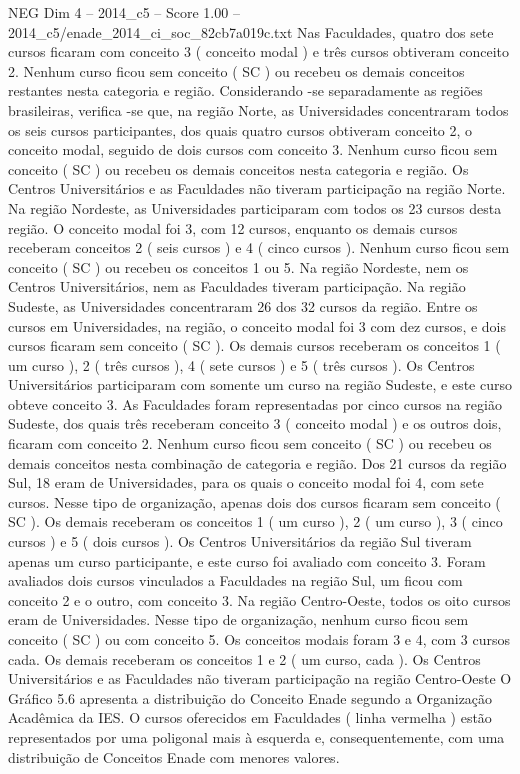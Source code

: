 \begin{textsample}{NEG Dim 4 – 2014\_c5 – Score 1.00 – 2014\_c5/enade\_2014\_ci\_soc\_82cb7a019c.txt}
Nas Faculdades, quatro dos sete cursos ficaram com conceito 3 ( conceito modal ) e três cursos obtiveram conceito 2.
Nenhum curso ficou sem conceito ( SC ) ou recebeu os demais conceitos restantes nesta categoria e região.
Considerando -se separadamente as regiões brasileiras, verifica -se que, na região Norte, as Universidades concentraram todos os seis cursos participantes, dos quais quatro cursos obtiveram conceito 2, o conceito modal, seguido de dois cursos com conceito 3.
Nenhum curso ficou sem conceito ( SC ) ou recebeu os demais conceitos nesta categoria e região.
Os Centros Universitários e as Faculdades não tiveram participação na região Norte.
Na região Nordeste, as Universidades participaram com todos os 23 cursos desta região.
O conceito modal foi 3, com 12 cursos, enquanto os demais cursos receberam conceitos 2 ( seis cursos ) e 4 ( cinco cursos ).
Nenhum curso ficou sem conceito ( SC ) ou recebeu os conceitos 1 ou 5.
Na região Nordeste, nem os Centros Universitários, nem as Faculdades tiveram participação.
Na região Sudeste, as Universidades concentraram 26 dos 32 cursos da região.
Entre os cursos em Universidades, na região, o conceito modal foi 3 com dez cursos, e dois cursos ficaram sem conceito ( SC ).
Os demais cursos receberam os conceitos 1 ( um curso ), 2 ( três cursos ), 4 ( sete cursos ) e 5 ( três cursos ).
Os Centros Universitários participaram com somente um curso na região Sudeste, e este curso obteve conceito 3.
As Faculdades foram representadas por cinco cursos na região Sudeste, dos quais três receberam conceito 3 ( conceito modal ) e os outros dois, ficaram com conceito 2.
Nenhum curso ficou sem conceito ( SC ) ou recebeu os demais conceitos nesta combinação de categoria e região.
Dos 21 cursos da região Sul, 18 eram de Universidades, para os quais o conceito modal foi 4, com sete cursos.
Nesse tipo de organização, apenas dois dos cursos ficaram sem conceito ( SC ).
Os demais receberam os conceitos 1 ( um curso ), 2 ( um curso ), 3 ( cinco cursos ) e 5 ( dois cursos ).
Os Centros Universitários da região Sul tiveram apenas um curso participante, e este curso foi avaliado com conceito 3.
Foram avaliados dois cursos vinculados a Faculdades na região Sul, um ficou com conceito 2 e o outro, com conceito 3.
Na região Centro-Oeste, todos os oito cursos eram de Universidades.
Nesse tipo de organização, nenhum curso ficou sem conceito ( SC ) ou com conceito 5.
Os conceitos modais foram 3 e 4, com 3 cursos cada.
Os demais receberam os conceitos 1 e 2 ( um curso, cada ).
Os Centros Universitários e as Faculdades não tiveram participação na região Centro-Oeste O Gráfico 5.6 apresenta a distribuição do Conceito Enade segundo a Organização Acadêmica da IES.
O cursos oferecidos em Faculdades ( linha vermelha ) estão representados por uma poligonal mais à esquerda e, consequentemente, com uma distribuição de Conceitos Enade com menores valores.

\end{textsample}
